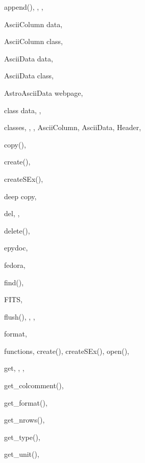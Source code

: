\begin{theindex}

  \item append(), , , 
  \item AsciiColumn
    \subitem data, 
  \item AsciiColumn class, 
  \item AsciiData
    \subitem data, 
  \item AsciiData class, 
  \item AstroAsciiData webpage, 

  \indexspace

  \item class data, , 
  \item classes, , , 
    \subitem AsciiColumn, 
    \subitem AsciiData, 
    \subitem Header, 
  \item copy(), 
  \item create(), 
  \item createSEx(), 

  \indexspace

  \item deep copy, 
  \item del, , 
  \item delete(), 

  \indexspace

  \item epydoc, 

  \indexspace

  \item fedora, 
  \item find(), 
  \item FITS, 
  \item flush(), , , 
  \item format, 
  \item functions, 
    \subitem create(), 
    \subitem createSEx(), 
    \subitem open(), 

  \indexspace

  \item get, , , 
  \item get\_colcomment(), 
  \item get\_format(), 
  \item get\_nrows(), 
  \item get\_type(), 
  \item get\_unit(), 


\end{theindex}
